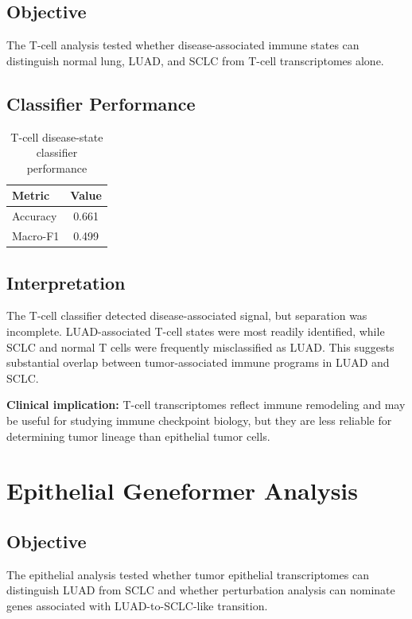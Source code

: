 \documentclass[11pt,a4paper]{article}
\begin{document}
\subsection{Objective}

The T-cell analysis tested whether disease-associated immune states can distinguish normal lung, LUAD, and SCLC from T-cell transcriptomes alone.

\subsection{Classifier Performance}

\begin{table}[htbp]
\centering
\caption{T-cell disease-state classifier performance}
\begin{tabular}{lc}
\toprule
Metric & Value \\
\midrule
Accuracy & 0.661 \\
Macro-F1 & 0.499 \\
\bottomrule
\end{tabular}
\end{table}

\subsection{Interpretation}

The T-cell classifier detected disease-associated signal, but separation was incomplete. LUAD-associated T-cell states were most readily identified, while SCLC and normal T cells were frequently misclassified as LUAD. This suggests substantial overlap between tumor-associated immune programs in LUAD and SCLC.

\textbf{Clinical implication:} T-cell transcriptomes reflect immune remodeling and may be useful for studying immune checkpoint biology, but they are less reliable for determining tumor lineage than epithelial tumor cells.

\section{Epithelial Geneformer Analysis}

\subsection{Objective}

The epithelial analysis tested whether tumor epithelial transcriptomes can distinguish LUAD from SCLC and whether perturbation analysis can nominate genes associated with LUAD-to-SCLC-like transition.
\end{document}
